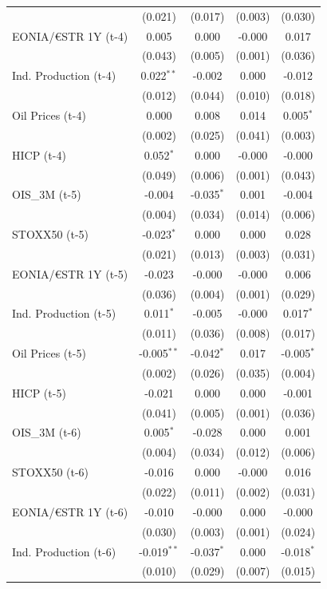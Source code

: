 \begin{longtable}[t]{lcccc}
 & (0.021) & (0.017) & (0.003) & (0.030)\\
EONIA/€STR 1Y (t-4) & 0.005 & 0.000 & -0.000 & 0.017\\
 & (0.043) & (0.005) & (0.001) & (0.036)\\
Ind. Production (t-4) & 0.022$^{**}$ & -0.002 & 0.000 & -0.012\\
 & (0.012) & (0.044) & (0.010) & (0.018)\\
Oil Prices (t-4) & 0.000 & 0.008 & 0.014 & 0.005$^{*}$\\
 & (0.002) & (0.025) & (0.041) & (0.003)\\
HICP (t-4) & 0.052$^{*}$ & 0.000 & -0.000 & -0.000\\
 & (0.049) & (0.006) & (0.001) & (0.043)\\
OIS\_3M (t-5) & -0.004 & -0.035$^{*}$ & 0.001 & -0.004\\
 & (0.004) & (0.034) & (0.014) & (0.006)\\
STOXX50 (t-5) & -0.023$^{*}$ & 0.000 & 0.000 & 0.028\\
 & (0.021) & (0.013) & (0.003) & (0.031)\\
EONIA/€STR 1Y (t-5) & -0.023 & -0.000 & -0.000 & 0.006\\
 & (0.036) & (0.004) & (0.001) & (0.029)\\
Ind. Production (t-5) & 0.011$^{*}$ & -0.005 & -0.000 & 0.017$^{*}$\\
 & (0.011) & (0.036) & (0.008) & (0.017)\\
Oil Prices (t-5) & -0.005$^{**}$ & -0.042$^{*}$ & 0.017 & -0.005$^{*}$\\
 & (0.002) & (0.026) & (0.035) & (0.004)\\
HICP (t-5) & -0.021 & 0.000 & 0.000 & -0.001\\
 & (0.041) & (0.005) & (0.001) & (0.036)\\
OIS\_3M (t-6) & 0.005$^{*}$ & -0.028 & 0.000 & 0.001\\
 & (0.004) & (0.034) & (0.012) & (0.006)\\
STOXX50 (t-6) & -0.016 & 0.000 & -0.000 & 0.016\\
 & (0.022) & (0.011) & (0.002) & (0.031)\\
EONIA/€STR 1Y (t-6) & -0.010 & -0.000 & 0.000 & -0.000\\
 & (0.030) & (0.003) & (0.001) & (0.024)\\
Ind. Production (t-6) & -0.019$^{**}$ & -0.037$^{*}$ & 0.000 & -0.018$^{*}$\\
 & (0.010) & (0.029) & (0.007) & (0.015)\\

\end{longtable}
